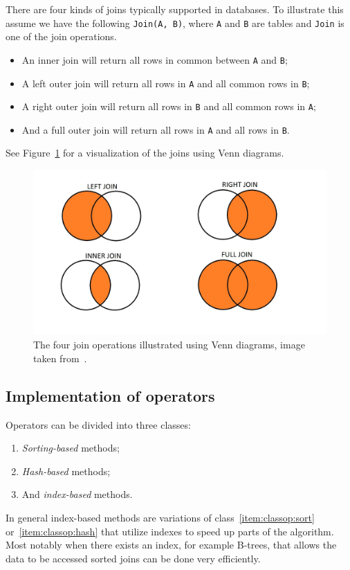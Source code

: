 There are four kinds of joins typically supported in databases. To illustrate
this assume we have the following \texttt{Join(A, B)}, where \texttt{A} and
\texttt{B} are tables and \texttt{Join} is one of the join operations.
\begin{itemize}
    \item An inner join will return all rows in common between \texttt{A} and \texttt{B};
    \item A left outer join will return all rows in \texttt{A} and all common rows in \texttt{B};
    \item A right outer join will return all rows in \texttt{B} and all common rows in \texttt{A};
    \item And a full outer join will return all rows in \texttt{A} and all rows in \texttt{B}.
\end{itemize}
See Figure~\ref{fig:vennjoin} for a visualization of the joins using Venn diagrams.

\begin{figure}[ht]
\includegraphics[scale=0.4]{Images/SQL-Join-Venn-Diagrams.jpg}
\caption[Illustration of join operations using Venn diagrams]{The four join operations illustrated using Venn diagrams, image taken from~\cite{brian_2014_better_bqj}.}\label{fig:vennjoin}
\end{figure}

\subsection{Implementation of operators}\label{sec:opimpl}

Operators can be divided into three classes:
\begin{enumerate}
    \item\label{item:classop:sort} \textit{Sorting-based} methods;
    \item\label{item:classop:hash} \textit{Hash-based} methods;
    \item\label{item:classop:index} And \textit{index-based} methods.
\end{enumerate}
In general index-based methods are variations of class~\ref{item:classop:sort}
or~\ref{item:classop:hash} that utilize indexes to speed up parts of the
algorithm. Most notably when there exists an index, for example B-trees, that
allows the data to be accessed sorted joins can be done very efficiently.

